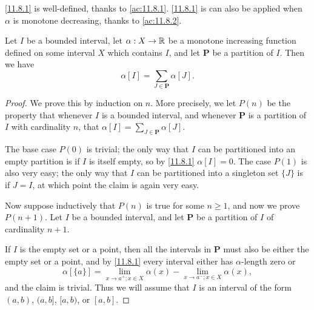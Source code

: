 \begin{note}
  \cref{11.8.1} is well-defined, thanks to \cref{ac:11.8.1}.
  \cref{11.8.1} is can also be applied when \(\alpha\) is monotone decreasing, thanks to \cref{ac:11.8.2}.
\end{note}

\setcounter{thm}{3}
\begin{lem}\label{11.8.4}
  Let \(I\) be a bounded interval, let \(\alpha : X \to \mathbb{R}\) be a monotone increasing function defined on some interval \(X\) which contains \(I\), and let \(\mathbf{P}\) be a partition of \(I\).
  Then we have
  \[
    \alpha[I] = \sum_{J \in \mathbf{P}} \alpha[J].
  \]
\end{lem}

\begin{proof}
  We prove this by induction on \(n\).
  More precisely, we let \(P(n)\) be the property that whenever \(I\) is a bounded interval, and whenever \(\mathbf{P}\) is a partition of \(I\) with cardinality \(n\), that \(\alpha[I] = \sum_{J \in \mathbf{P}} \alpha[J]\).

  The base case \(P(0)\) is trivial;
  the only way that \(I\) can be partitioned into an empty partition is if \(I\) is itself empty, so by \cref{11.8.1} \(\alpha[I] = 0\).
  The case \(P(1)\) is also very easy;
  the only way that \(I\) can be partitioned into a singleton set \(\{J\}\) is if \(J = I\), at which point the claim is again very easy.

  Now suppose inductively that \(P(n)\) is true for some \(n \geq 1\), and now we prove \(P(n + 1)\).
  Let \(I\) be a bounded interval, and let \(\mathbf{P}\) be a partition of \(I\) of cardinality \(n + 1\).

  If \(I\) is the empty set or a point, then all the intervals in \(\mathbf{P}\) must also be either the empty set or a point, and by \cref{11.8.1} every interval either has \(\alpha\)-length zero or
  \[
    \alpha[\{a\}] = \lim_{x \to a^+ ; x \in X} \alpha(x) - \lim_{x \to a^- ; x \in X} \alpha(x),
  \]
  and the claim is trivial.
  Thus we will assume that \(I\) is an interval of the form \((a, b)\), \((a, b]\), \([a, b)\), or \([a, b]\).


\end{proof}
